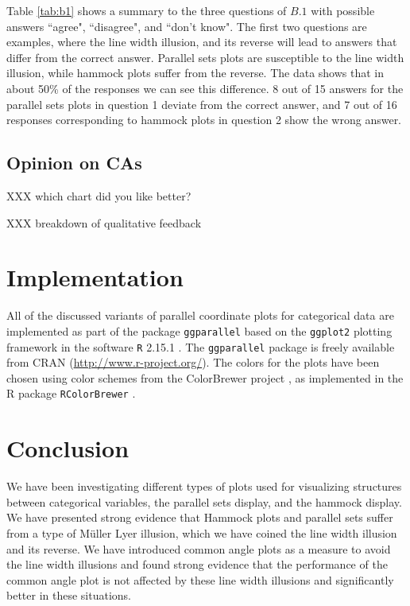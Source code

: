 Table \ref{tab:b1} shows a summary to the  three questions of $B.1$ with possible answers ``agree", ``disagree", and ``don't know".
The first two questions are  examples, where the line width illusion, and its reverse will lead to answers that differ from the correct answer. Parallel sets plots are susceptible to the line width illusion, while hammock plots suffer from the reverse. The data shows that in about 50\% of the responses we can see this difference. 8 out of 15 answers for the parallel sets plots in question 1 deviate from the correct answer, and 7 out of 16 responses corresponding to hammock plots in question 2 show the wrong answer.


\subsection*{Opinion on CAs}
XXX which chart did you like better?

XXX breakdown of qualitative feedback



\section{Implementation}

All  of the discussed variants of parallel coordinate plots for categorical data are implemented as part of the package {\tt ggparallel} based on the {\tt ggplot2} \cite{ggplot2} plotting framework in the software {\tt R} 2.15.1 \citep{R}. The  {\tt ggparallel} package is freely available from CRAN (\url{http://www.r-project.org/}).
The colors for the plots have been chosen using color schemes from the ColorBrewer project  \cite{colorbrewer} , as implemented in the R package {\tt RColorBrewer}  \cite{RColorBrewer} .


\section{Conclusion}
%
We have been investigating different types of plots used for visualizing structures between categorical variables, the parallel sets display, and the hammock display.
We have presented strong evidence that Hammock plots and parallel sets suffer from a type of M\"uller Lyer illusion, which we have coined the line width illusion and its reverse. 
We have introduced common angle plots as a measure to avoid the line width illusions and found strong evidence that  the performance of the common angle plot is not affected by these line width illusions and significantly better in these situations.


